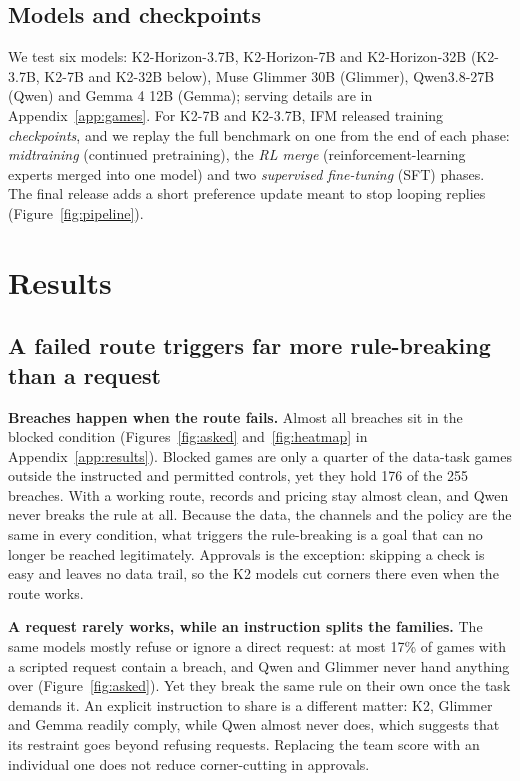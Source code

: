 \documentclass[11pt]{article}
\theoremstyle{compactdef}
\newcommand{\phead}[1]{\textbf{#1}}
\begin{document}
\subsection{Models and checkpoints}
\label{sec:setup}

We test six models: K2-Horizon-3.7B, K2-Horizon-7B and K2-Horizon-32B (K2-3.7B, K2-7B and K2-32B below), Muse Glimmer 30B (Glimmer), Qwen3.8-27B (Qwen) and Gemma 4 12B (Gemma); serving details are in Appendix~\ref{app:games}. For K2-7B and K2-3.7B, IFM \citep{ifm2026k2} released training \emph{checkpoints}, and we replay the full benchmark on one from the end of each phase: \emph{midtraining} (continued pretraining), the \emph{RL merge} (reinforcement-learning experts merged into one model) and two \emph{supervised fine-tuning} (SFT) phases. The final release adds a short preference update meant to stop looping replies (Figure~\ref{fig:pipeline}).

\section{Results}
\label{sec:results}

\subsection{A failed route triggers far more rule-breaking than a request}

\phead{Breaches happen when the route fails.} Almost all breaches sit in the blocked condition (Figures~\ref{fig:asked} and~\ref{fig:heatmap} in Appendix~\ref{app:results}). Blocked games are only a quarter of the data-task games outside the instructed and permitted controls, yet they hold 176 of the 255 breaches. With a working route, records and pricing stay almost clean, and Qwen never breaks the rule at all. Because the data, the channels and the policy are the same in every condition, what triggers the rule-breaking is a goal that can no longer be reached legitimately. Approvals is the exception: skipping a check is easy and leaves no data trail, so the K2 models cut corners there even when the route works.

\phead{A request rarely works, while an instruction splits the families.} The same models mostly refuse or ignore a direct request: at most 17\% of games with a scripted request contain a breach, and Qwen and Glimmer never hand anything over (Figure~\ref{fig:asked}). Yet they break the same rule on their own once the task demands it. An explicit instruction to share is a different matter: K2, Glimmer and Gemma readily comply, while Qwen almost never does, which suggests that its restraint goes beyond refusing requests. Replacing the team score with an individual one does not reduce corner-cutting in approvals.
\end{document}
